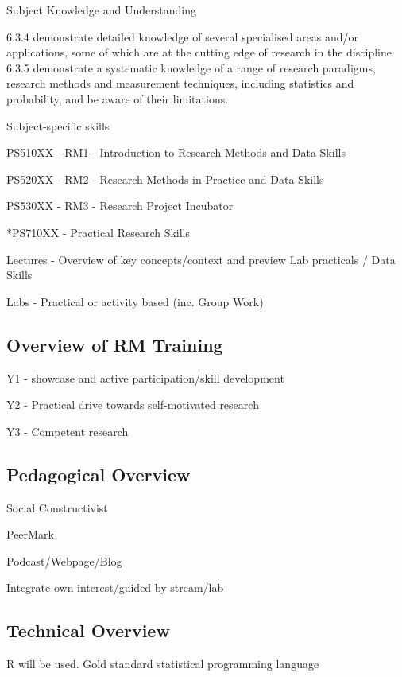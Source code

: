 \documentclass[
  11pt,
  letterpaper,
  oneside,
  open=any]{scrbook}
\begin{document}
Subject Knowledge and Understanding

6.3.4 demonstrate detailed knowledge of several specialised areas and/or
applications, some of which are at the cutting edge of research in the
discipline 6.3.5 demonstrate a systematic knowledge of a range of
research paradigms, research methods and measurement techniques,
including statistics and probability, and be aware of their limitations.

Subject-specific skills

PS510XX - RM1 - Introduction to Research Methods and Data Skills

PS520XX - RM2 - Research Methods in Practice and Data Skills

PS530XX - RM3 - Research Project Incubator

*PS710XX - Practical Research Skills

Lectures - Overview of key concepts/context and preview Lab practicals /
Data Skills

Labs - Practical or activity based (inc. Group Work)

\hypertarget{overview-of-rm-training}{%
\subsection{Overview of RM Training}\label{overview-of-rm-training}}

Y1 - showcase and active participation/skill development

Y2 - Practical drive towards self-motivated research

Y3 - Competent research

\hypertarget{pedagogical-overview}{%
\subsection{Pedagogical Overview}\label{pedagogical-overview}}

Social Constructivist

PeerMark

Podcast/Webpage/Blog

Integrate own interest/guided by stream/lab

\hypertarget{technical-overview}{%
\subsection{Technical Overview}\label{technical-overview}}

R will be used. Gold standard statistical programming language
\end{document}
